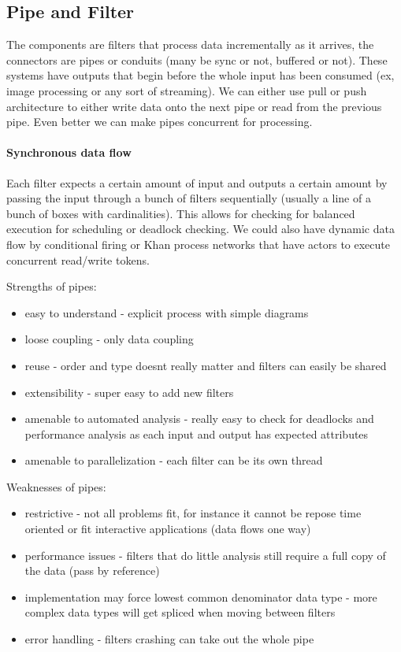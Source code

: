 \documentclass{article}
\begin{document}
\subsection*{Pipe and Filter} %
\label{sub:pipe_and_filter}
The components are filters that process data incrementally as it arrives, the connectors are pipes or conduits (many be sync or not, buffered or not). These systems have outputs that begin before the whole input has been consumed (ex, image processing or any sort of streaming). We can either use pull or push architecture to either write data onto the next pipe or read from the previous pipe. Even better we can make pipes concurrent for processing.

\paragraph{Synchronous data flow} %
\label{par:synchronous_data_flow}
Each filter expects a certain amount of input and outputs a certain amount by passing the input through a bunch of filters sequentially (usually a line of a bunch of boxes with cardinalities). This allows for checking for balanced execution for scheduling or deadlock checking. We could also have dynamic data flow by conditional firing or Khan process networks that have actors to execute concurrent read/write tokens.

Strengths of pipes:
\begin{itemize}
    \item easy to understand - explicit process with simple diagrams
    \item loose coupling - only data coupling
    \item reuse - order and type doesnt really matter and filters can easily be shared
    \item extensibility - super easy to add new filters
    \item amenable to automated analysis - really easy to check for deadlocks and performance analysis as each input and output has expected attributes
    \item amenable to parallelization - each filter can be its own thread
\end{itemize}

Weaknesses of pipes:
\begin{itemize}
    \item restrictive - not all problems fit, for instance it cannot be repose time oriented or fit interactive applications (data flows one way)
    \item performance issues - filters that do little analysis still require a full copy of the data (pass by reference)
    \item implementation may force lowest common denominator data type - more complex data types will get spliced when moving between filters
    \item error handling - filters crashing can take out the whole pipe
\end{itemize}
\end{document}
